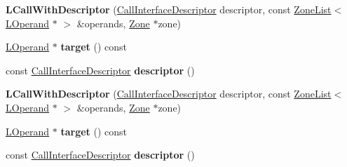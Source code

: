 \begin{DoxyCompactItemize}
\item 
{\bfseries L\+Call\+With\+Descriptor} (\hyperlink{classv8_1_1internal_1_1_call_interface_descriptor}{Call\+Interface\+Descriptor} descriptor, const \hyperlink{classv8_1_1internal_1_1_zone_list}{Zone\+List}$<$ \hyperlink{classv8_1_1internal_1_1_l_operand}{L\+Operand} $\ast$ $>$ \&operands, \hyperlink{classv8_1_1internal_1_1_zone}{Zone} $\ast$zone)\hypertarget{classv8_1_1internal_1_1_l_call_with_descriptor_aef08b64c59fea5bdf7e3cc4e6ad17da5}{}\label{classv8_1_1internal_1_1_l_call_with_descriptor_aef08b64c59fea5bdf7e3cc4e6ad17da5}

\item 
\hyperlink{classv8_1_1internal_1_1_l_operand}{L\+Operand} $\ast$ {\bfseries target} () const \hypertarget{classv8_1_1internal_1_1_l_call_with_descriptor_a5f36cfb0ab3007ac639a4fa68b4b4162}{}\label{classv8_1_1internal_1_1_l_call_with_descriptor_a5f36cfb0ab3007ac639a4fa68b4b4162}

\item 
const \hyperlink{classv8_1_1internal_1_1_call_interface_descriptor}{Call\+Interface\+Descriptor} {\bfseries descriptor} ()\hypertarget{classv8_1_1internal_1_1_l_call_with_descriptor_ac81ca90af15fc24656387041c7893655}{}\label{classv8_1_1internal_1_1_l_call_with_descriptor_ac81ca90af15fc24656387041c7893655}

\item 
{\bfseries L\+Call\+With\+Descriptor} (\hyperlink{classv8_1_1internal_1_1_call_interface_descriptor}{Call\+Interface\+Descriptor} descriptor, const \hyperlink{classv8_1_1internal_1_1_zone_list}{Zone\+List}$<$ \hyperlink{classv8_1_1internal_1_1_l_operand}{L\+Operand} $\ast$ $>$ \&operands, \hyperlink{classv8_1_1internal_1_1_zone}{Zone} $\ast$zone)\hypertarget{classv8_1_1internal_1_1_l_call_with_descriptor_aef08b64c59fea5bdf7e3cc4e6ad17da5}{}\label{classv8_1_1internal_1_1_l_call_with_descriptor_aef08b64c59fea5bdf7e3cc4e6ad17da5}

\item 
\hyperlink{classv8_1_1internal_1_1_l_operand}{L\+Operand} $\ast$ {\bfseries target} () const \hypertarget{classv8_1_1internal_1_1_l_call_with_descriptor_a5f36cfb0ab3007ac639a4fa68b4b4162}{}\label{classv8_1_1internal_1_1_l_call_with_descriptor_a5f36cfb0ab3007ac639a4fa68b4b4162}

\item 
const \hyperlink{classv8_1_1internal_1_1_call_interface_descriptor}{Call\+Interface\+Descriptor} {\bfseries descriptor} ()\hypertarget{classv8_1_1internal_1_1_l_call_with_descriptor_ac81ca90af15fc24656387041c7893655}{}\label{classv8_1_1internal_1_1_l_call_with_descriptor_ac81ca90af15fc24656387041c7893655}


\end{DoxyCompactItemize}
